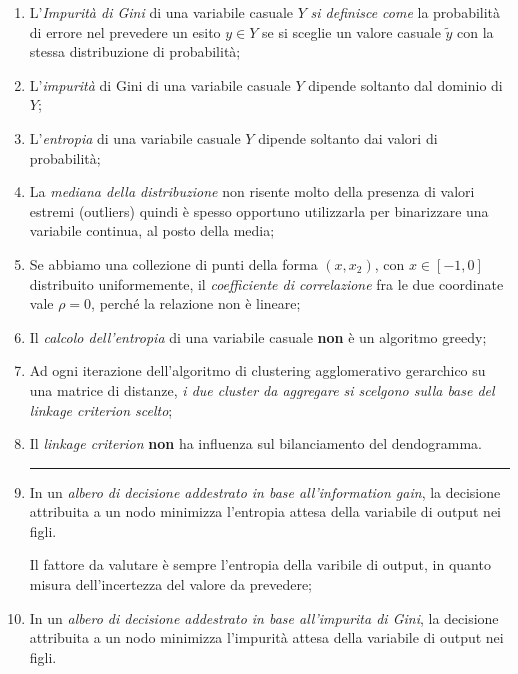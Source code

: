 \begin{enumerate}

	\item L'\emph{Impurità di Gini} di una variabile casuale \( Y \) \emph{si definisce come} la probabilità di errore nel prevedere un esito \( y \in Y \) se si sceglie un valore casuale \( \tilde{y} \) con la stessa distribuzione di probabilità;

	\item L'\emph{impurità} di Gini di una variabile casuale \( Y \) dipende soltanto dal dominio di \( Y \);

	\item L'\emph{entropia} di una variabile casuale \( Y \) dipende soltanto dai valori di probabilità;

	\item La \emph{mediana della distribuzione} non risente molto della presenza di valori estremi (outliers) quindi è spesso opportuno utilizzarla per binarizzare una variabile continua, al posto della media;

	\item Se abbiamo una collezione di punti della forma \( (x, x_{2} ) \), con \( x \in [−1, 0] \) distribuito uniformemente, il \emph{coefficiente di correlazione} fra le due coordinate vale \( \rho = 0 \), perché la relazione non è lineare;

	\item Il \emph{calcolo dell'entropia} di una variabile casuale \textbf{non} è un algoritmo greedy;

	\item Ad ogni iterazione dell'algoritmo di clustering agglomerativo gerarchico su una matrice di distanze, \emph{i due cluster da aggregare si scelgono sulla base del linkage criterion scelto};

	\item Il \emph{linkage criterion} \textbf{non} ha influenza sul bilanciamento del dendogramma.

\rule{\linewidth}{0.4pt}

	\item In un \emph{albero di decisione addestrato in base all'information gain}, la decisione attribuita a un nodo minimizza l'entropia attesa della variabile di output nei figli.

	Il fattore da valutare è sempre l'entropia della varibile di output, in quanto misura dell'incertezza del valore da prevedere;

	\item In un \emph{albero di decisione addestrato in base all'impurita di Gini}, la decisione attribuita a un nodo minimizza l'impurità attesa della variabile di output nei figli.


\end{enumerate}
